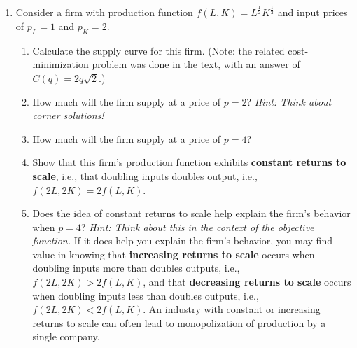 \begin{enumerate}
\begin{enumerate}
    \end{enumerate}











\item Consider a firm with production function $f(L, K)=L^{\frac{1}{2}}K^{\frac{1}{2}}$ and input prices of $p_L=1$ and $p_K=2$.

    \begin{enumerate}

    \item Calculate the supply curve for this firm. (Note: the related cost-minimization problem was done in the text, with an answer of $C(q)=2q\sqrt{2}$.)


    \item How much will the firm supply at a price of $p=2$? \emph{Hint: Think about corner solutions!}


    \item How much will the firm supply at a price of $p=4$?


    \item Show that this firm's production function exhibits \textbf{constant returns to scale}, i.e., that doubling inputs doubles output, i.e., $f(2L, 2K)=2f(L, K)$.


    \item Does the idea of constant returns to scale help explain the firm's behavior when $p=4$? \emph{Hint: Think about this in the context of the objective function.} If it does help you explain the firm's behavior, you may find value in knowing that \textbf{increasing returns to scale} occurs when doubling inputs more than doubles outputs, i.e., $f(2L, 2K)>2f(L, K)$, and that \textbf{decreasing returns to scale} occurs when doubling inputs less than doubles outputs, i.e., $f(2L, 2K)<2f(L, K)$. An industry with constant or increasing returns to scale can often lead to monopolization of production by a single company.


\end{enumerate}
\end{enumerate}
